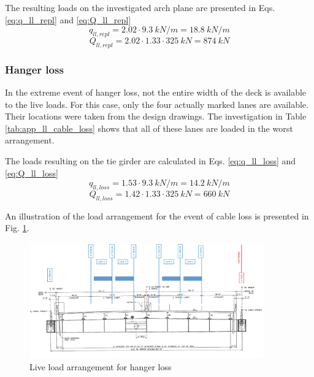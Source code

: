 The resulting loads on the investigated arch plane are presented in Eqs. \eqref{eq:q_ll_repl} and \eqref{eq:Q_ll_repl}
\begin{equation}
    q_{ll, repl} = 2.02 \cdot \SI{9.3}{kN/m} = \SI{18.8}{kN/m}
    \label{eq:q_ll_repl}
\end{equation}
\begin{equation}
    Q_{ll, repl} = 2.02 \cdot 1.33 \cdot \SI{325}{kN} = \SI{874}{kN}
    \label{eq:Q_ll_repl}
\end{equation}

\newpage
\subsubsection{Hanger loss} \label{Appendx_A_Live_loading_3}
In the extreme event of hanger loss, not the entire width of the deck is available to the live loads. For this case, only the four actually marked lanes are available. Their locations were taken from the design drawings. The investigation in Table \ref{tab:app_ll_cable_loss} shows that all of these lanes are loaded in the worst arrangement.


The loads resulting on the tie girder are calculated in Eqs. \eqref{eq:q_ll_loss} and \eqref{eq:Q_ll_loss}
\begin{equation}
    q_{ll, loss} = 1.53 \cdot \SI{9.3}{kN/m} = \SI{14.2}{kN/m}
    \label{eq:q_ll_loss}
\end{equation}
\begin{equation}
    Q_{ll, loss} = 1.42 \cdot 1.33 \cdot \SI{325}{kN} = \SI{660}{kN}
    \label{eq:Q_ll_loss}
\end{equation}

An illustration of the load arrangement for the event of cable loss is presented in Fig. \ref{fig:app_hangers_cable_loss}.

\begin{figure}[H]
    \centering
    \includegraphics[width=0.9\textwidth]{overleaf/Appendix/Pictures/Cross_Section_LL_Cable Loss.PNG}
    \caption{Live load arrangement for hanger loss}
    \label{fig:app_hangers_cable_loss}
\end{figure}


